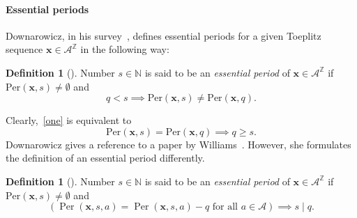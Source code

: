 \documentclass[leqno,a4paper,12pt]{article}
\theoremstyle{definition}
\newtheorem{Def}[Th]{Definition}
\newcommand{\divides}{\mid}
\newcommand{\Per}{\operatorname{Per}\nolimits}
\newcommand{\Z}{{\mathbb{Z}}}
\begin{document}
\paragraph{Essential periods}
Downarowicz, in his survey~\cite{MR2180227}, defines essential periods for a given Toeplitz sequence $\bm{x}\in\mathcal{A}^\Z$ in the following way:
\begin{Def}[{\cite[Definition 7.3]{MR2180227}}]\label{pierwsza}
Number $s\in \mathbb{N}$ is said to be an \textit{essential period} of $\bm{x}\in\mathcal{A}^\Z$ if $\text{Per}(\bm{x},s)\neq\emptyset$ and
\begin{equation}\label{one}
q<s \implies \text{Per}(\bm{x},s)\neq \text{Per}(\bm{x},q).
\end{equation}
\end{Def}
Clearly,~\eqref{one} is equivalent to
\begin{equation}\label{one1}
\text{Per}(\bm{x},s)= \text{Per}(\bm{x},q) \implies q\geq s.
\end{equation}
Downarowicz gives a reference to a paper by Williams~\cite{MR756807}. However, she formulates the definition of an essential period differently.
\begin{Def}[\cite{MR756807}]\label{druga}
Number $s\in \mathbb{N}$ is said to be an \textit{essential period }of $\bm{x}\in\mathcal{A}^\Z$ if $\text{Per}(\bm{x},s)\neq\emptyset$ and
\begin{equation}\label{dwa}
\left(\Per(\bm{x},s,a)=\Per(\bm{x},s,a)-q \text{ for all }a\in\mathcal{A}\right) \implies s\divides q.
\end{equation}
\end{Def}
\end{document}
